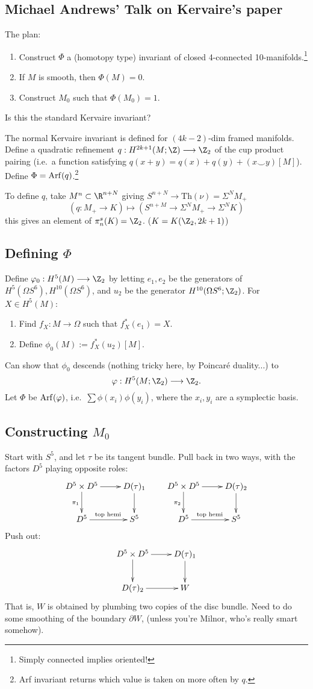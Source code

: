 \documentclass[11pt]{article}
\newcommand{\KanSemResponse}[1]
{
\thispagestyle{fancy}
\section{#1}
}
\begin{document}
\begin{JandrKervaire}
\KanSemResponse
{Michael Andrews' Talk on Kervaire's paper}
The plan:
\begin{enumerate}
\item Construct $\Phi$ a (homotopy type) invariant of closed 4-connected 10-manifolds.\footnote{Simply connected implies oriented!}
\item If $M$ is smooth, then $\Phi(M)=0$.
\item Construct $M_0$ such that $\Phi(M_0)=1$.
\end{enumerate}
\begin{question}
Is this the standard Kervaire invariant?
\end{question}
The normal Kervaire invariant is defined for $(4k-2)$-dim framed manifolds. Define a quadratic refinement $q:H^{2k+1}(M;\Z)\to\Z_2$ of the cup product pairing (i.e.\ a function satisfying $q(x+y)=q(x)+q(y)+(x\smile y)[M]$). Define $\Phi=\operatorname{Arf}(q)$.\footnote{Arf invariant returns which value is taken on more often by $q$.}

To define $q$, take $M^n\subset \R^{n+N}$ giving $S^{n+N}\to\text{Th}(\nu)=\Sigma^NM_+$
\[\left(q:M_+\to K\right)\mapsto(S^{n+M}\to \Sigma^NM_+\to\Sigma^NK)\]
this gives an element of $\pi_n^s(K)=\Z_2$. ($K=K(\Z_2,2k+1)$)

\subsection*{Defining $\Phi$}
Define $\phi_0:H^5(M)\to\Z_2$ by letting $e_1,e_2$ be the generators of $H^5(\Omega S^6),H^{10}(\Omega S^6)$, and $u_2$ be the generator $H^{10}(\Omega S^6;\Z_2)$. For $X\in H^5(M)$:
\begin{enumerate}
\item Find $f_X:M\to\Omega$ such that $f_X^*(e_1)=X$.
\item Define $\phi_0(M):=f^*_X(u_2)[M]$.
\end{enumerate}
Can show that $\phi_0$ descends (nothing tricky here, by Poincar\'e duality...) to
\[\phi:H^5(M;\Z_2)\to\Z_2.\]
Let $\Phi$ be $\operatorname{Arf}(\varphi)$, i.e.\ $\sum\phi(x_i)\phi(y_i)$, where the $x_i,y_i$ are a symplectic basis.
\subsection*{Constructing $M_0$}
Start with $S^5$, and let $\tau$ be its tangent bundle.  Pull back in two ways, with the factors $D^5$ playing opposite roles:
\[\xymatrix{
D^5\times D^5\ar[d]_{\pi_1}\ar[r]&D(\tau)_1\ar[d]\\
D^5\ar[r]^{\text{top hemi}}&S^5
}\qquad
\xymatrix{
D^5\times D^5\ar[d]_{\pi_2}\ar[r]&D(\tau)_2\ar[d]\\
D^5\ar[r]^{\text{top hemi}}&S^5
}\]
Push out:
\[\xymatrix{
\ar[d]D^5\times D^5\ar[r]&D(\tau)_1\ar[d]\\
D(\tau)_2\ar[r]&W
}\]
That is, $W$ is obtained by plumbing two copies of the disc bundle.
Need to do some smoothing of the boundary $\partial W$, (unless you're Milnor, who's really smart somehow).


\end{JandrKervaire}
\end{document}
